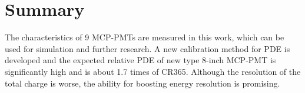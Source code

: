 \section{Summary}
\label{Summary}
The characteristics of 9 MCP-PMTs are measured in this work, which can be used for simulation and further research. A new calibration method for PDE is developed and the expected relative PDE of new type 8-inch MCP-PMT is significantly high and is about 1.7 times of CR365. Although the resolution of the total charge is worse, the ability for boosting energy resolution is promising.